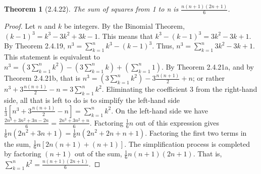 \documentclass[a4paper, 12pt]{article}
\theoremstyle{plain}
\newtheorem*{theorem*}{Theorem}
\begin{document}
	
	\begin{theorem*}[2.4.22]
		The sum of squares from 1 to n is $\frac{n(n+1)(2n+1)}{6}$.
	\end{theorem*}
	
	\begin{proof}
		Let $n$ and $k$ be integers. By the Binomial Theorem, \newline $(k-1)^{3} = k^{3} - 3k^{2} + 3k - 1$. This means that $k^{3} - (k - 1)^{3} = 3k^{2} - 3k + 1$. By Theorem 2.4.19, $n^{3} = \sum_{k=1}^{n} k^{3} - (k - 1)^{3}$. Thus, $n^{3} = \sum_{k=1}^{n} 3k^{2} - 3k + 1$. This statement is equivalent to $n^{3} = (3\sum_{k=1}^{n} k^{2}) - (3\sum_{k=1}^{n} k) + (\sum_{k=1}^{n} 1)$. By Theorem 2.4.21a, and by Theorem 2.4.21b, that is \newline  $n^{3} = (3\sum_{k=1}^{n} k^{2}) - 3 \frac{n(n+1)}{2} + n$; or rather $n^{3} + 3\frac{n(n+1)}{2} - n = 3\sum_{k=1}^{n} k^{2}$. Eliminating the coefficient $3$ from the right-hand side, all that is left to do is to simplify the left-hand side $\frac{1}{3}[n^{3} + 3\frac{n(n+1)}{2} - n] = \sum_{k=1}^{n} k^{2}$. On the left-hand side we have $\frac{2n^{3} + 3n^{2} + 3n - 2n}{6} = \frac{2n^{3} + 3n^{2} + n}{6}$. Factoring $\frac{1}{6}n$ out of this expression gives $\frac{1}{6}n(2n^{2} + 3n + 1) = \frac{1}{6}n(2n^{2} + 2n + n + 1)$. Factoring the first two terms in the sum, $\frac{1}{6}n[2n(n + 1) + (n + 1)]$. The simplification process is completed by factoring $(n+1)$ out of the sum, $\frac{1}{6}n(n+1)(2n+1)$. That is, $\sum_{k=1}^{n} k^{2} = \frac{n(n+1)(2n+1)}{6}$.
	\end{proof}
\end{document}
